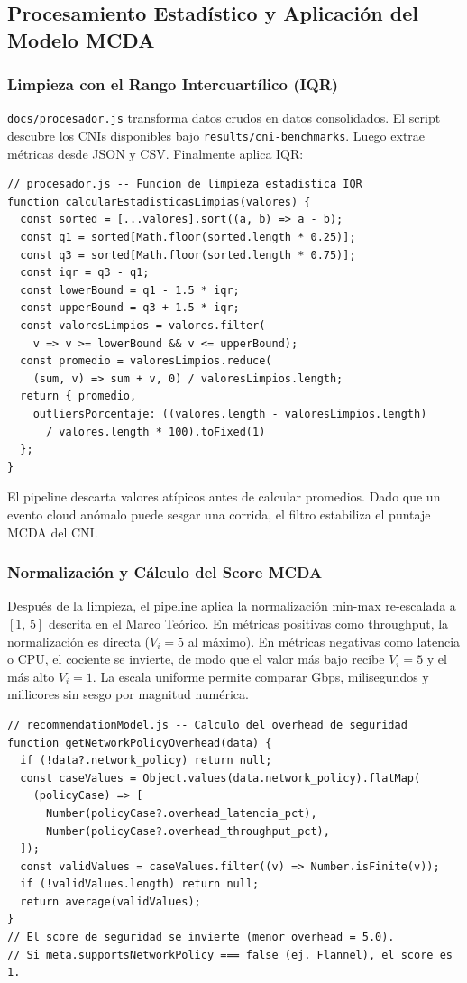 \subsection{Procesamiento Estadístico y Aplicación del Modelo MCDA}

\subsubsection{Limpieza con el Rango Intercuartílico (IQR)}

\texttt{docs/procesador.js} transforma datos crudos en datos consolidados. El script descubre los CNIs disponibles bajo \texttt{results/cni-benchmarks}. Luego extrae métricas desde JSON y CSV. Finalmente aplica IQR:

\begin{lstlisting}
// procesador.js -- Funcion de limpieza estadistica IQR
function calcularEstadisticasLimpias(valores) {
  const sorted = [...valores].sort((a, b) => a - b);
  const q1 = sorted[Math.floor(sorted.length * 0.25)];
  const q3 = sorted[Math.floor(sorted.length * 0.75)];
  const iqr = q3 - q1;
  const lowerBound = q1 - 1.5 * iqr;
  const upperBound = q3 + 1.5 * iqr;
  const valoresLimpios = valores.filter(
    v => v >= lowerBound && v <= upperBound);
  const promedio = valoresLimpios.reduce(
    (sum, v) => sum + v, 0) / valoresLimpios.length;
  return { promedio,
    outliersPorcentaje: ((valores.length - valoresLimpios.length)
      / valores.length * 100).toFixed(1)
  };
}
\end{lstlisting}

El pipeline descarta valores atípicos antes de calcular promedios. Dado que un evento cloud anómalo puede sesgar una corrida, el filtro estabiliza el puntaje MCDA del CNI.

\subsubsection{Normalización y Cálculo del Score MCDA}

Después de la limpieza, el pipeline aplica la normalización min-max re-escalada a $[1,\,5]$ descrita en el Marco Teórico. En métricas positivas como throughput, la normalización es directa ($V_i = 5$ al máximo). En métricas negativas como latencia o CPU, el cociente se invierte, de modo que el valor más bajo recibe $V_i = 5$ y el más alto $V_i = 1$. La escala uniforme permite comparar Gbps, milisegundos y millicores sin sesgo por magnitud numérica.

\begin{lstlisting}
// recommendationModel.js -- Calculo del overhead de seguridad
function getNetworkPolicyOverhead(data) {
  if (!data?.network_policy) return null;
  const caseValues = Object.values(data.network_policy).flatMap(
    (policyCase) => [
      Number(policyCase?.overhead_latencia_pct),
      Number(policyCase?.overhead_throughput_pct),
  ]);
  const validValues = caseValues.filter((v) => Number.isFinite(v));
  if (!validValues.length) return null;
  return average(validValues);
}
// El score de seguridad se invierte (menor overhead = 5.0).
// Si meta.supportsNetworkPolicy === false (ej. Flannel), el score es 1.
\end{lstlisting}

